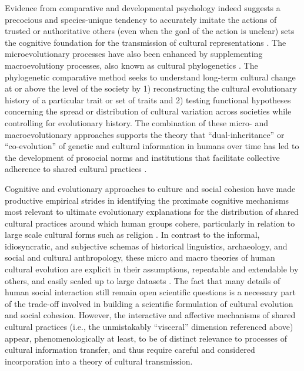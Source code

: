 Evidence from comparative and developmental psychology indeed suggests a precocious and species-unique tendency to accurately imitate the actions of trusted or authoritative others (even when the goal of the action is unclear) sets the cognitive foundation for the transmission of cultural representations \citep{Tomasello2014a}.  The microevolutionary processes have also been enhanced by supplementing macroevolutiony processes, also known as cultural phylogenetics \citep{Mace1994}.  The phylogenetic comparative method seeks to understand long-term cultural change at or above the level of the society by 1) reconstructing the cultural evolutionary history of a particular trait or set of traits and 2) testing functional hypotheses concerning the spread or distribution of cultural variation across societies while controlling for evolutionary history.  The combination of these micro- and macroevolutionary approaches supports the theory that  ``dual-inheritance'' or ``co-evolution'' of genetic and cultural information in humans over time has led to the development of prosocial norms and institutions that facilitate collective adherence to shared cultural practices \citep{Richerson2008,Chudek2011}.

Cognitive and evolutionary approaches to culture and social cohesion have made productive empirical strides in identifying the proximate cognitive mechanisms most relevant to ultimate evolutionary explanations for the distribution of shared cultural practices around which human groups cohere, particularly in relation to large scale cultural forms such as religion \citep{Henrich2015,Purzycki2016b}.  In contrast to the informal, idiosyncratic, and subjective schemas of historical linguistics, archaeology, and social and cultural anthropology, these micro and macro theories of human cultural evolution are explicit in their assumptions, repeatable and extendable by others, and easily scaled up to large datasets \citep{Mesoudi2017}. The fact that many details of human social interaction still remain open scientific questions is a necessary part of the trade-off involved in building a scientific formulation of cultural evolution and social cohesion. However, the interactive and affective mechanisms of shared cultural practices (i.e., the unmistakably ``visceral'' dimension referenced above) appear, phenomenologically at least, to be of distinct relevance to processes of cultural information transfer, and thus require careful and considered incorporation into a theory of cultural transmission.

